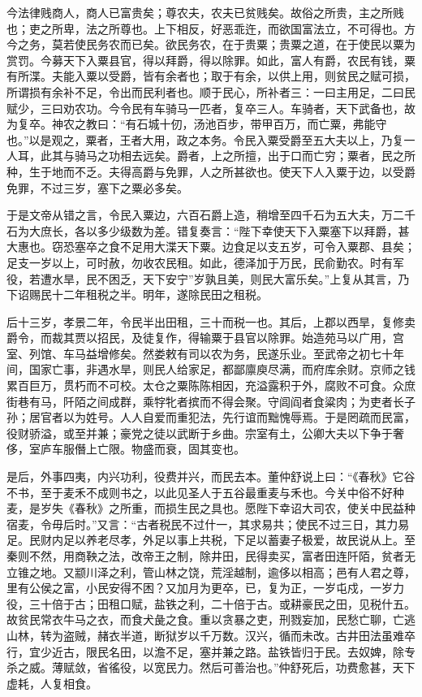 \documentclass[12pt,UTF8]{ctexbook}
\begin{document}
今法律贱商人，商人已富贵矣；尊农夫，农夫已贫贱矣。故俗之所贵，主之所贱也；吏之所卑，法之所尊也。上下相反，好恶乖迕，而欲国富法立，不可得也。方今之务，莫若使民务农而已矣。欲民务农，在于贵粟；贵粟之道，在于使民以粟为赏罚。今募天下入粟县官，得以拜爵，得以除罪。如此，富人有爵，农民有钱，粟有所渫。夫能入粟以受爵，皆有余者也；取于有余，以供上用，则贫民之赋可损，所谓损有余补不足，令出而民利者也。顺于民心，所补者三：一曰主用足，二曰民赋少，三曰劝农功。今令民有车骑马一匹者，复卒三人。车骑者，天下武备也，故为复卒。神农之教曰：“有石城十仞，汤池百步，带甲百万，而亡粟，弗能守也。”以是观之，粟者，王者大用，政之本务。令民入粟受爵至五大夫以上，乃复一人耳，此其与骑马之功相去远矣。爵者，上之所擅，出于口而亡穷；粟者，民之所种，生于地而不乏。夫得高爵与免罪，人之所甚欲也。使天下人入粟于边，以受爵免罪，不过三岁，塞下之粟必多矣。



于是文帝从错之言，令民入粟边，六百石爵上造，稍增至四千石为五大夫，万二千石为大庶长，各以多少级数为差。错复奏言：“陛下幸使天下入粟塞下以拜爵，甚大惠也。窃恐塞卒之食不足用大渫天下粟。边食足以支五岁，可令入粟郡、县矣；足支一岁以上，可时赦，勿收农民租。如此，德泽加于万民，民俞勤农。时有军役，若遭水旱，民不困乏，天下安宁”岁孰且美，则民大富乐矣。”上复从其言，乃下诏赐民十二年租税之半。明年，遂除民田之租税。



后十三岁，孝景二年，令民半出田租，三十而税一也。其后，上郡以西旱，复修卖爵令，而裁其贾以招民，及徒复作，得输粟于县官以除罪。始造苑马以广用，宫室、列馆、车马益增修矣。然娄敕有司以农为务，民遂乐业。至武帝之初七十年间，国家亡事，非遇水旱，则民人给家足，都鄙廪庾尽满，而府库余财。京师之钱累百巨万，贯朽而不可校。太仓之粟陈陈相因，充溢露积于外，腐败不可食。众庶街巷有马，阡陌之间成群，乘牸牝者摈而不得会聚。守闾阎者食粱肉；为吏者长子孙；居官者以为姓号。人人自爱而重犯法，先行谊而黜愧辱焉。于是罔疏而民富，役财骄溢，或至并兼；豪党之徒以武断于乡曲。宗室有土，公卿大夫以下争于奢侈，室庐车服僭上亡限。物盛而衰，固其变也。



是后，外事四夷，内兴功利，役费并兴，而民去本。董仲舒说上曰：“《春秋》它谷不书，至于麦禾不成则书之，以此见圣人于五谷最重麦与禾也。今关中俗不好种麦，是岁失《春秋》之所重，而损生民之具也。愿陛下幸诏大司农，使关中民益种宿麦，令毋后时。”又言：“古者税民不过什一，其求易共；使民不过三日，其力易足。民财内足以养老尽孝，外足以事上共税，下足以蓄妻子极爱，故民说从上。至秦则不然，用商鞅之法，改帝王之制，除井田，民得卖买，富者田连阡陌，贫者无立锥之地。又颛川泽之利，管山林之饶，荒淫越制，逾侈以相高；邑有人君之尊，里有公侯之富，小民安得不困？又加月为更卒，已，复为正，一岁屯戍，一岁力役，三十倍于古；田租口赋，盐铁之利，二十倍于古。或耕豪民之田，见税什五。故贫民常衣牛马之衣，而食犬彘之食。重以贪暴之吏，刑戮妄加，民愁亡聊，亡逃山林，转为盗贼，赭衣半道，断狱岁以千万数。汉兴，循而未改。古井田法虽难卒行，宜少近古，限民名田，以澹不足，塞并兼之路。盐铁皆归于民。去奴婢，除专杀之威。薄赋敛，省徭役，以宽民力。然后可善治也。”仲舒死后，功费愈甚，天下虚耗，人复相食。
\end{document}
